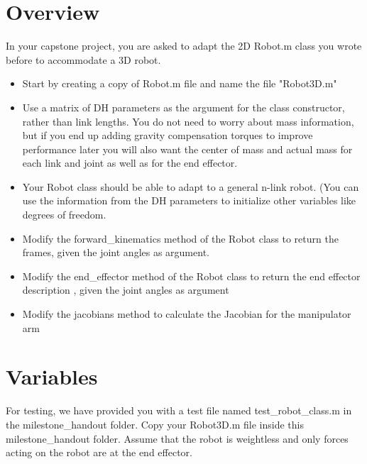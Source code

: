 \documentclass{/home/puneet/Desktop/courses/16384/Assignments/16384_doc}
\begin{document}
\maketitle

\section{Overview}
In your capstone project, you are asked to adapt the 2D Robot.m class you wrote before to accommodate a 3D robot.

\begin{itemize}
\item Start by creating a copy of Robot.m file and name the file "Robot3D.m"

\item Use a matrix of DH parameters as the argument for the class constructor,
rather than link lengths. You do not need to worry about mass information,
but if you end up adding gravity compensation torques to improve performance
later you will also want the center of mass and actual mass for each link and joint as well as for the end effector.

\item Your Robot class should be able to adapt to a general n-link robot. (You can use the information from the DH parameters to initialize other variables like degrees of freedom. 

\item Modify the forward\_kinematics method of the Robot class to return the frames, given the joint angles as argument.

\item Modify the end\_effector method of the Robot class to return the end effector description , given the joint angles as argument

\item Modify the jacobians method to calculate the Jacobian for the manipulator arm
\end{itemize}

\section{Variables}
For testing, we have provided you with a test file named test\_robot\_class.m in the milestone\_handout folder. Copy your Robot3D.m file inside this milestone\_handout folder. Assume that the robot is weightless and only forces acting on the robot are at the end effector. 
\end{document}
